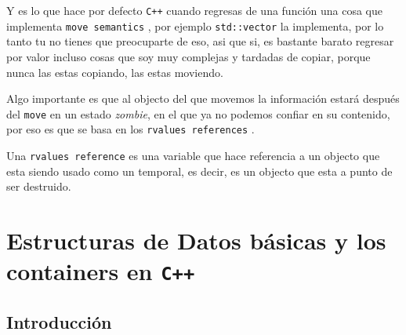\documentclass[12pt, fleqn]{report}                             %
\theoremstyle{break}                                            %
\newcommand{\textCode}[1]  { \texttt{#1} }                      %
\newcommand{\Cpp}{\ignorespaces\textCode{C++}}                  %
\begin{document}
                \cite{ModernCppWhatYouNeedToKnow}

                Y es lo que hace por defecto \Cpp cuando regresas de una función una cosa que implementa
                \textCode{move semantics}, por ejemplo \textCode{std::vector} la implementa, por lo tanto
                tu no tienes que preocuparte de eso, asi que si, es bastante barato regresar por valor
                incluso cosas que soy muy complejas y tardadas de copiar, porque nunca las estas copiando, 
                las estas moviendo.

                Algo importante es que al objecto del que movemos la información estará después del
                \textCode{move} en un estado \emph{zombie}, en el que ya no podemos confiar en su contenido, 
                por eso es que se basa en los \textCode{rvalues references}.

                Una \textCode{rvalues reference} es una variable que hace referencia a un objecto que esta siendo usado
                como un temporal, es decir, es un objecto que esta a punto de ser destruido.
                





\part{Estructuras de Datos básicas y los containers  en \Cpp}
\label{part:EstructurasDeDatosBasicas}

    \clearpage
    \chapter{Introducción}

        \clearpage
\end{document}
